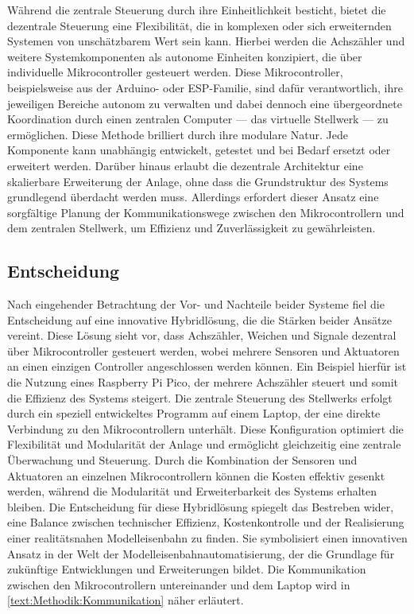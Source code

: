 Während die zentrale Steuerung durch ihre Einheitlichkeit besticht, bietet die dezentrale Steuerung eine Flexibilität, die in komplexen oder sich erweiternden Systemen von unschätzbarem Wert sein kann. Hierbei werden die Achszähler und weitere Systemkomponenten als autonome Einheiten konzipiert, die über individuelle Mikrocontroller gesteuert werden. Diese Mikrocontroller, beispielsweise aus der Arduino- oder ESP-Familie, sind dafür verantwortlich, ihre jeweiligen Bereiche autonom zu verwalten und dabei dennoch eine übergeordnete Koordination durch einen zentralen Computer --- das virtuelle Stellwerk --- zu ermöglichen.
\newline
Diese Methode brilliert durch ihre modulare Natur. Jede Komponente kann unabhängig entwickelt, getestet und bei Bedarf ersetzt oder erweitert werden. Darüber hinaus erlaubt die dezentrale Architektur eine skalierbare Erweiterung der Anlage, ohne dass die Grundstruktur des Systems grundlegend überdacht werden muss. Allerdings erfordert dieser Ansatz eine sorgfältige Planung der Kommunikationswege zwischen den Mikrocontrollern und dem zentralen Stellwerk, um Effizienz und Zuverlässigkeit zu gewährleisten.

\subsection{Entscheidung}\label{text:Methodik:Systemkonfiguration:Entscheidung}

Nach eingehender Betrachtung der Vor- und Nachteile beider Systeme fiel die Entscheidung auf eine innovative Hybridlösung, die die Stärken beider Ansätze vereint. Diese Lösung sieht vor, dass Achszähler, Weichen und Signale dezentral über Mikrocontroller gesteuert werden, wobei mehrere Sensoren und Aktuatoren an einen einzigen Controller angeschlossen werden können. Ein Beispiel hierfür ist die Nutzung eines Raspberry Pi Pico, der mehrere Achszähler steuert und somit die Effizienz des Systems steigert.
\newline
Die zentrale Steuerung des Stellwerks erfolgt durch ein speziell entwickeltes Programm auf einem Laptop, der eine direkte Verbindung zu den Mikrocontrollern unterhält. Diese Konfiguration optimiert die Flexibilität und Modularität der Anlage und ermöglicht gleichzeitig eine zentrale Überwachung und Steuerung. Durch die Kombination der Sensoren und Aktuatoren an einzelnen Mikrocontrollern können die Kosten effektiv gesenkt werden, während die Modularität und Erweiterbarkeit des Systems erhalten bleiben.
\newline
Die Entscheidung für diese Hybridlösung spiegelt das Bestreben wider, eine Balance zwischen technischer Effizienz, Kostenkontrolle und der Realisierung einer realitätsnahen Modelleisenbahn zu finden. Sie symbolisiert einen innovativen Ansatz in der Welt der Modelleisenbahnautomatisierung, der die Grundlage für zukünftige Entwicklungen und Erweiterungen bildet.
\newline
Die Kommunikation zwischen den Mikrocontrollern untereinander und dem Laptop wird in \autoref{text:Methodik:Kommunikation}  näher erläutert.
